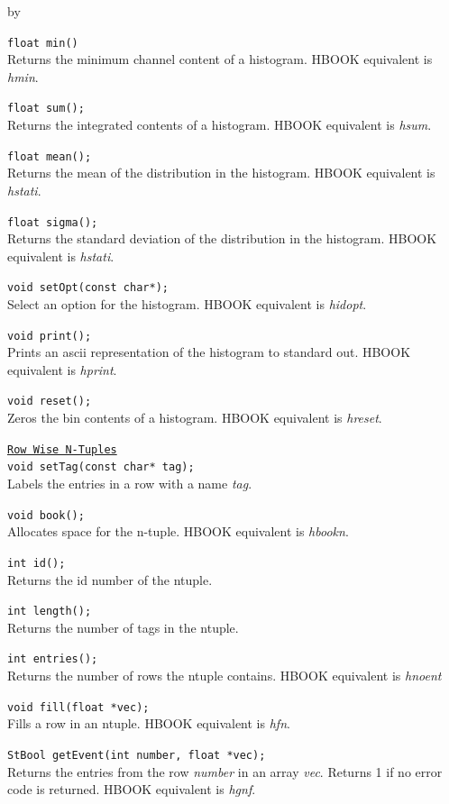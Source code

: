 \documentclass[twoside]{article}
\newcommand{\comp}[1]{\texttt{#1}}%
\newcommand{\entrylabel}[1]{\mbox{\textbf{{#1}}}\hfil}%
\newenvironment{entry}
{\begin{list}{}%
    {\renewcommand{\makelabel}{\entrylabel}%
     \setlength{\labelwidth}{90pt}%
     \setlength{\leftmargin}{\labelwidth}
     \advance\leftmargin by \labelsep%
      }%
    }%
  {\end{list}}
\newcommand{\Entrylabel}[1]%
{\raisebox{0pt}[1ex][0pt]{\makebox[\labelwidth][l]%
    {\parbox[t]{\labelwidth}{\hspace{0pt}\textbf{{#1}}}}}}
\newenvironment{Entry}%
{\renewcommand{\entrylabel}{\Entrylabel}\begin{entry}}%
  {\end{entry}}
\begin{document}
\begin{Entry}
  \verb+float min()+\\
  Returns the minimum channel content of a histogram.  HBOOK equivalent
  is {\em hmin}.
  
  \verb+float sum();+\\
  Returns the integrated contents of a histogram.  HBOOK equivalent
  is {\em hsum}.

  \verb+float mean();+\\
  Returns the mean of the distribution in the histogram.
  HBOOK equivalent is {\em hstati}.
  
  \verb+float sigma();+\\
  Returns the standard deviation of the distribution in the histogram.
  HBOOK equivalent is {\em hstati}.
  
  \verb+void setOpt(const char*);+\\
  Select an option for the histogram.  HBOOK equivalent is {\em hidopt}.
  
  \verb+void print();+\\
  Prints an ascii representation of the histogram to standard out.
  HBOOK equivalent is {\em hprint}.
  
  \verb+void reset();+\\
  Zeros the bin contents of a histogram.  HBOOK equivalent is {\em hreset}.

  \comp{\underline{Row Wise N-Tuples}}\\
  \verb+void setTag(const char* tag);+\\
  Labels the entries in a row with a name {\em tag}.
  
  \verb+void book();+\\
  Allocates space for the n-tuple.  HBOOK equivalent is {\em hbookn}.
  
  \verb+int id();+\\
  Returns the id number of the ntuple.

  \verb+int length();+\\
  Returns the number of tags in the ntuple.
  
  \verb+int entries();+\\
  Returns the number of rows the ntuple contains.  HBOOK equivalent
  is {\em hnoent}
  
  \verb+void fill(float *vec);+\\
  Fills a row in an ntuple.  HBOOK equivalent is {\em hfn}.
  
  \verb+StBool getEvent(int number, float *vec);+\\
  Returns the entries from the row {\em number} in an array {\em vec}.
  Returns 1 if no error code is returned.
  HBOOK equivalent is {\em hgnf}.


\end{Entry}
\end{document}
